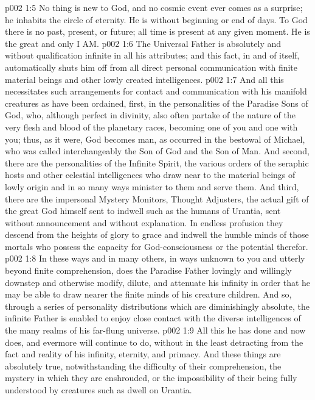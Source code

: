 \vs p002 1:5 No thing is new to God, and no cosmic event ever comes as a surprise; he inhabits the circle of eternity. He is without beginning or end of days. To God there is no past, present, or future; all time is present at any given moment. He is the great and only I AM.
\vs p002 1:6 \pc The Universal Father is absolutely and without qualification infinite in all his attributes; and this fact, in and of itself, automatically shuts him off from all direct personal communication with finite material beings and other lowly created intelligences.
\vs p002 1:7 And all this necessitates such arrangements for contact and communication with his manifold creatures as have been ordained, first, in the personalities of the Paradise Sons of God, who, although perfect in divinity, also often partake of the nature of the very flesh and blood of the planetary races, becoming one of you and one with you; thus, as it were, God becomes man, as occurred in the bestowal of Michael, who was called interchangeably the Son of God and the Son of Man. And second, there are the personalities of the Infinite Spirit, the various orders of the seraphic hosts and other celestial intelligences who draw near to the material beings of lowly origin and in so many ways minister to them and serve them. And third, there are the impersonal Mystery Monitors, Thought Adjusters, the actual gift of the great God himself sent to indwell such as the humans of Urantia, sent without announcement and without explanation. In endless profusion they descend from the heights of glory to grace and indwell the humble minds of those mortals who possess the capacity for God\hyp{}consciousness or the potential therefor.
\vs p002 1:8 In these ways and in many others, in ways unknown to you and utterly beyond finite comprehension, does the Paradise Father lovingly and willingly downstep and otherwise modify, dilute, and attenuate his infinity in order that he may be able to draw nearer the finite minds of his creature children. And so, through a series of personality distributions which are diminishingly absolute, the infinite Father is enabled to enjoy close contact with the diverse intelligences of the many realms of his far\hyp{}flung universe.
\vs p002 1:9 All this he has done and now does, and evermore will continue to do, without in the least detracting from the fact and reality of his infinity, eternity, and primacy. And these things are absolutely true, notwithstanding the difficulty of their comprehension, the mystery in which they are enshrouded, or the impossibility of their being fully understood by creatures such as dwell on Urantia.
